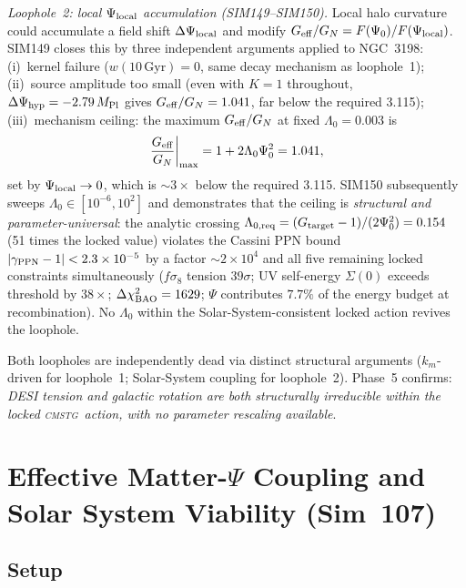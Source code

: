 \documentclass[12pt,a4paper]{article}
\newcommand{\CMSTG}{\textsc{cmstg}}
\begin{document}
\emph{Loophole~2: local $\Psi_{\rm local}$ accumulation (SIM149--SIM150).}
Local halo curvature could accumulate a field shift $\Delta\Psi_{\rm local}$
and modify $G_{\rm eff}/G_N=F(\Psi_0)/F(\Psi_{\rm local})$.  SIM149 closes
this by three independent arguments applied to NGC~3198: (i)~kernel failure
($w(10\,\mathrm{Gyr})=0$, same decay mechanism as loophole~1); (ii)~source
amplitude too small (even with $K=1$ throughout, $\Delta\Psi_{\rm hyp}=
-2.79\,M_{\rm Pl}$ gives $G_{\rm eff}/G_N=1.041$, far below the required
3.115); (iii)~mechanism ceiling: the maximum $G_{\rm eff}/G_N$ at fixed
$\Lambda_0=0.003$ is
\begin{equation}
  \left.\frac{G_{\rm eff}}{G_N}\right|_{\rm max}
    = 1 + 2\Lambda_0\Psi_0^2 = 1.041,
  \label{eq:geff_ceiling}
\end{equation}
set by $\Psi_{\rm local}\to0$, which is $\sim3\times$ below the required 3.115.
SIM150 subsequently sweeps $\Lambda_0\in[10^{-6},10^2]$ and demonstrates that
the ceiling is \emph{structural and parameter-universal}: the analytic crossing
$\Lambda_{0,{\rm req}}=(G_{\rm target}-1)/(2\Psi_0^2)=0.154$ (51 times the
locked value) violates the Cassini PPN bound $|\gamma_{\rm PPN}-1|<2.3\times
10^{-5}$ by a factor $\sim2\times10^4$ and all five remaining locked constraints
simultaneously ($f\sigma_8$ tension $39\sigma$; UV self-energy $\Sigma(0)$
exceeds threshold by $38\times$; $\Delta\chi^2_{\rm BAO}=1629$; $\Psi$
contributes $7.7\%$ of the energy budget at recombination).  No
$\Lambda_0$ within the Solar-System-consistent locked action revives the
loophole.

Both loopholes are independently dead via distinct structural arguments
($k_m$-driven for loophole~1; Solar-System coupling for loophole~2).
Phase~5 confirms: \emph{DESI tension and galactic rotation are both
structurally irreducible within the locked \CMSTG\ action, with no parameter
rescaling available}.

\section{Effective Matter-$\Psi$ Coupling and Solar System Viability (Sim~107)}
\label{sec:sim107}

\subsection{Setup}
\end{document}
